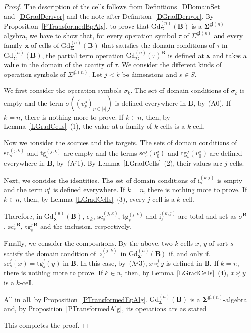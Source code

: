 \documentclass[a4paper, reqno
]{amsart}
\newcommand{\bb}[1]{\ensuremath{\lvert #1 \rvert}}
\newcommand{\sig}[1]{\mathbf{#1}}             %
\newcommand{\gl}{\mathrm{gl}}                %
\newcommand{\src}{\mathrm{sc}}
\newcommand{\tgt}{\mathrm{tg}}
\newcommand{\Gd}{\mathrm{Gd}}
\theoremstyle{plain}
\theoremstyle{definition}
\begin{document}
\begin{proof}
The description of the cells follows from Definitions~\ref{DDomainSet} and~\ref{DGradDerivor} and the note after Definition~\ref{DGradDerivor}.
By Proposition~\ref{PTransformedEpAlg}, to prove that $\Gd^{(n)}_{\sig{\Sigma}}(\mathbf{B})$ is a $\sig{\Sigma}^{\gl(n)}$-algebra, we have to show that, for every operation symbol $\tau$ of $\Sigma^{\gl(n)}$ and every family $\mathbf{x}$ of cells of $\Gd^{(n)}_{\sig{\Sigma}}(\mathbf{B})$ that satisfies the domain conditions of $\tau$ in $\Gd^{(n)}_{\sig{\Sigma}}(\mathbf{B})$, the partial term operation $\Gd^{(n)}_{\sig{\Sigma}}(\tau)^{\mathbf{B}}$ is defined at $\mathbf{x}$ and takes a value in the domain of the coarity of $\tau$.
We consider the different kinds of operation symbols of $\Sigma^{\gl(n)}$.
Let $j<k$ be dimensions and $s\in S$.

We first consider the operation symbols $\sigma_{k}$.
The set of domain conditions of $\sigma_{k}$ is empty and the term $\sigma((v^{\mathbf{s}}_{p})_{p\in\bb{\mathbf{s}}})$ is defined everywhere in $\mathbf{B}$, by~(A0).
If $k=n$, there is nothing more to prove.
If $k\in n$, then, by Lemma~\ref{LGradCells}~(1), the value at a family of $k$-cells is a $k$-cell.

Now we consider the sources and the targets.
The sets of domain conditions of $\src^{(j,k)}_{s}$ and $\tgt^{(j,k)}_{s}$ are empty and the terms $\src^{j}_{s}(v^{s}_{0})$ and $\tgt^{j}_{s}(v^{s}_{0})$ are defined everywhere in $\mathbf{B}$, by~(A$^{j}$1).
By Lemma~\ref{LGradCells}~(2), their values are $j$-cells.

Next, we consider the identities.
The set of domain conditions of $\mathrm{i}^{(k,j)}_{s}$ is empty and the term $v^{s}_{0}$ is defined everywhere.
If $k=n$, there is nothing more to prove.
If $k\in n$, then, by Lemma~\ref{LGradCells}~(3), every $j$-cell is a $k$-cell.

Therefore, in $\Gd^{(n)}_{\sig{\Sigma}}(\mathbf{B})$, $\sigma_{k}$, $\src^{(j,k)}_{s}$, $\tgt^{(j,k)}_{s}$ and $\mathrm{i}^{(k,j)}_{s}$ are total and act as $\sigma^{\mathbf{B}}$, $\src^{j\,\mathbf{B}}_{s}$, $\tgt^{j\,\mathbf{B}}_{s}$ and the inclusion, respectively.

Finally, we consider the compositions.
By the above, two $k$-cells $x$, $y$ of sort $s$ satisfy the domain condition of $\circ^{(j,k)}_{s}$ in $\Gd^{(n)}_{\sig{\Sigma}}(\mathbf{B})$ if, and only if, $\src^{j}_{s}(x)=\tgt^{j}_{s}(y)$ in $\mathbf{B}$.
In this case, by~(A$^{j}$3), $x\circ^{j}_{s}y$ is defined in $\mathbf{B}$.
If $k=n$, there is nothing more to prove.
If $k\in n$, then, by Lemma~\ref{LGradCells}~(4), $x\circ^{j}_{s}y$ is a $k$-cell.

All in all, by Proposition~\ref{PTransformedEpAlg}, $\Gd^{(n)}_{\sig{\Sigma}}(\mathbf{B})$ is a $\sig{\Sigma}^{\gl(n)}$-algebra and, by Proposition~\ref{PTransformedAlg}, its operations are as stated.

This completes the proof.
\end{proof}
\end{document}

